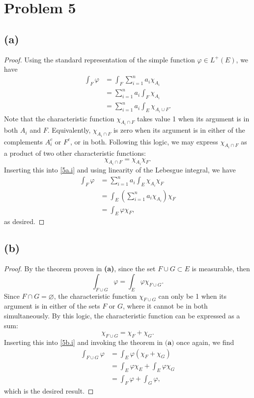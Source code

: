 \documentclass{article}
\begin{document}
\section*{Problem 5}
\subsection*{(a)}
\begin{proof}
	Using the standard representation of the simple function $\varphi \in L^+(E)$, we have
	\begin{align}
		\int_F \varphi &= \int_F \sum_{i=1}^{n} a_i \chi_{A_i} \\
		&= \sum_{i=1}^{n} a_i \int_F\chi_{A_i} \\
		&= \sum_{i=1}^n a_i \int_E \chi_{A_i \cup F}. \label{5a.i}
	\end{align}
	Note that the characteristic function $\chi_{A_i \cap F}$ takes value 1 when its argument is in both $A_i$ and $F$. Equivalently, $\chi_{A_i \cap F}$ is zero when its argument is in either of the complements $A_i^c$ or $F^c$, or in both. Following this logic, we may express $\chi_{A_i \cap F}$ as a product of two other characteristic functions:
	\begin{equation}
		\chi_{A_i \cap F} = \chi_{A_i} \chi_F.
	\end{equation}
	Inserting this into \eqref{5a.i} and using linearity of the Lebesgue integral, we have
	\begin{align}
		\int_F \varphi &= \sum_{i=1}^n a_i \int_E \chi_{A_i} \chi_F \\
		&= \int_E \left(\sum_{i=1}^n a_i \chi_{A_i}\right) \chi_F \\
		&= \int_E \varphi \chi_F,
	\end{align}
	as desired.
\end{proof}

\subsection*{(b)}
\begin{proof}
	By the theorem proven in \textbf{(a)}, since the set $F\cup G \subset E$ is measurable, then
	\begin{equation}\label{5b.i}
		\int_{F \cup G} \varphi = \int_E \varphi \chi_{F \cup G}.
	\end{equation}
	Since $F \cap G = \varnothing$, the characteristic function $\chi_{F \cup G}$ can only be 1 when its argument is in either of the sets $F$ or $G$, where it cannot be in both simultaneously. By this logic, the characteristic function can be expressed as a sum:
	\begin{equation}
		\chi_{F \cup G} = \chi_F + \chi_G.
	\end{equation}
	Inserting this into \eqref{5b.i} and invoking the theorem in $\textbf{(a)}$ once again, we find
	\begin{align}
		\int_{F \cup G} \varphi &= \int_E \varphi \left( \chi_F + \chi_G \right) \\
		&= \int_E \varphi \chi_E + \int_E \varphi \chi_G \\
		&= \int_F \varphi + \int_G \varphi,
	\end{align}
	which is the desired result.
\end{proof}
\end{document}
